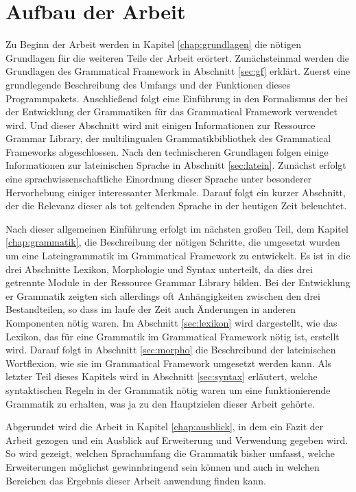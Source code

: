 \documentclass[12pt,abstract=on,titlepage,bibliography=totoc,ngerman,listof=totoc]{scrreprt}
\begin{document}
\section{Aufbau der Arbeit}
\label{sec:aufbau}
Zu Beginn der Arbeit werden in Kapitel \ref{chap:grundlagen} die nötigen Grundlagen für die weiteren Teile der Arbeit erörtert. Zunächsteinmal werden die Grundlagen des Grammatical Framework in Abschnitt \ref{sec:gf} erklärt. Zuerst eine grundlegende Beschreibung des Umfangs und der Funktionen dieses Programmpakets. Anschließend folgt eine Einführung in den Formalismus der bei der Entwicklung der Grammatiken für das Grammatical Framework verwendet wird. Und dieser Abschnitt wird mit einigen Informationen zur Ressource Grammar Library, der multilingualen Grammatikbibliothek des Grammatical Frameworks abgeschlossen. Nach den technischeren Grundlagen folgen einige Informationen zur lateinischen Sprache in Abschnitt \ref{sec:latein}. Zunächst erfolgt eine sprachwissenschaftliche Einordnung dieser Sprache unter besonderer Hervorhebung einiger interessanter Merkmale. Darauf folgt ein kurzer Abschnitt, der die Relevanz dieser als tot geltenden Sprache in der heutigen Zeit beleuchtet. \par
Nach dieser allgemeinen Einführung erfolgt im nächsten großen Teil, dem Kapitel \ref{chap:grammatik}, die Beschreibung der nötigen Schritte, die umgesetzt wurden um eine Lateingrammatik im Grammatical Framework zu entwickelt. Es ist in die drei Abschnitte Lexikon, Morphologie und Syntax unterteilt, da dies drei getrennte Module in der Ressource Grammar Library bilden. Bei der Entwicklung er Grammatik zeigten sich allerdings oft Anhängigkeiten zwischen den drei Bestandteilen, so dass im laufe der Zeit auch Änderungen in anderen Komponenten nötig waren. Im Abschnitt \ref{sec:lexikon} wird dargestellt, wie das Lexikon, das für eine Grammatik im Grammatical Framework nötig ist, erstellt wird. Darauf folgt in Abschnitt \ref{sec:morpho} die Beschreibund der lateinischen Wortflexion, wie sie im Grammatical Framework umgesetzt werden kann. Als letzter Teil dieses Kapitels wird in Abschnitt \ref{sec:syntax} erläutert, welche syntaktischen Regeln in der Grammatik nötig waren um eine funktionierende Grammatik zu erhalten, was ja zu den Hauptzielen dieser Arbeit gehörte. \par
Abgerundet wird die Arbeit in Kapitel \ref{chap:ausblick}, in dem ein Fazit der Arbeit gezogen und ein Ausblick auf Erweiterung und Verwendung gegeben wird. So wird gezeigt, welchen Sprachumfang die Grammatik bisher umfasst, welche Erweiterungen möglichst gewinnbringend sein können und auch in welchen Bereichen das Ergebnis dieser Arbeit anwendung finden kann.
\pagebreak
\end{document}
